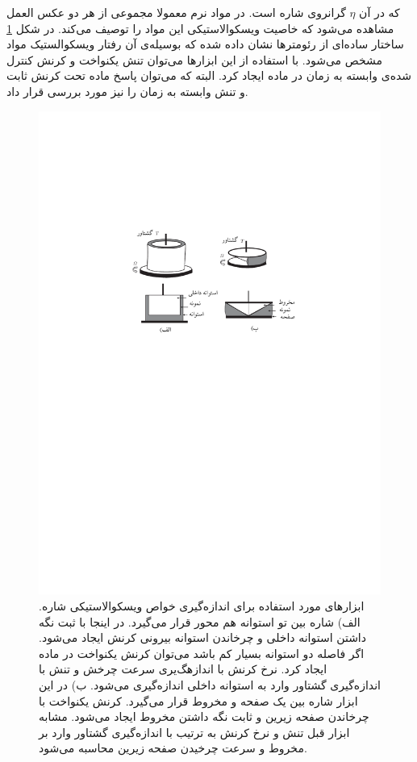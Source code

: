 که در آن $\eta$ گرانروی شاره است. در مواد نرم معمولا مجموعی از هر دو عکس العمل مشاهده می‌شود که خاصیت ویسکوالاستیکی این مواد را توصیف می‌کند. در شکل \ref{fig:rheo} ساختار ساده‌ای از رئومترها نشان داده شده که بوسیله‌ی آن رفتار ویسکوالستیک مواد مشخص می‌شود. با استفاده از این ابزارها می‌توان تنش یکنواخت و کرنش کنترل شده‌ی وابسته به زمان در ماده ایجاد کرد. البته که می‌توان پاسخ ماده تحت کرنش ثابت و تنش وابسته به زمان را نیز مورد بررسی قرار داد.
\begin{figure}[htbp]
\begin{center}
\includegraphics[width=5in]{Figs/9_1}
\caption{
ابزارهای مورد استفاده برای اندازه‌گیری خواص ویسکوالاستیکی شاره‌. الف) شاره بین تو استوانه هم محور قرار می‌گیرد. در اینجا با ثبت نگه داشتن استوانه داخلی و چرخاندن استوانه بیرونی کرنش ایجاد می‌شود. اگر فاصله دو استوانه بسیار کم  باشد می‌توان کرنش یکنواخت در ماده ایجاد کرد. نرخ کرنش با اندازهگ‌یری سرعت چرخش و تنش با اندازه‌گیری گشتاور وارد به استوانه داخلی اندازه‌گیری می‌شود. ب) در این ابزار شاره بین یک صفحه و مخروط قرار می‌گیرد. کرنش یکنواخت با چرخاندن صفحه زیرین و ثابت نگه داشتن مخروط ایجاد می‌شود. مشابه ابزار قبل تنش و نرخ کرنش به ترتیب با اندازه‌گیری گشتاور وارد بر مخروط و سرعت چرخیدن صفحه زیرین محاسبه می‌شود.
}
\label{fig:rheo}
\end{center}
\end{figure}
